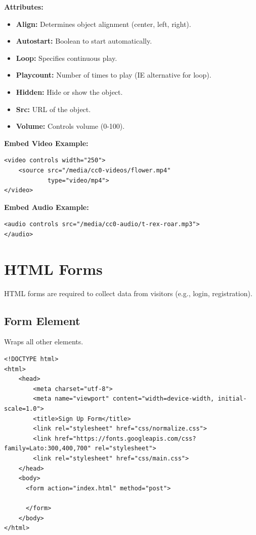\documentclass[12pt,a4paper]{article}
\begin{document}
\textbf{Attributes:}
\begin{itemize}
    \item \textbf{Align:} Determines object alignment (center, left, right).
    \item \textbf{Autostart:} Boolean to start automatically.
    \item \textbf{Loop:} Specifies continuous play.
    \item \textbf{Playcount:} Number of times to play (IE alternative for loop).
    \item \textbf{Hidden:} Hide or show the object.
    \item \textbf{Src:} URL of the object.
    \item \textbf{Volume:} Controls volume (0-100).
\end{itemize}

\textbf{Embed Video Example:}
\begin{verbatim}
<video controls width="250">
    <source src="/media/cc0-videos/flower.mp4"
            type="video/mp4">
</video>
\end{verbatim}

\textbf{Embed Audio Example:}
\begin{verbatim}
<audio controls src="/media/cc0-audio/t-rex-roar.mp3">
</audio>
\end{verbatim}

\section*{HTML Forms}
HTML forms are required to collect data from visitors (e.g., login, registration).

\subsection*{Form Element}
Wraps all other elements.
\begin{verbatim}
<!DOCTYPE html>
<html>
    <head>
        <meta charset="utf-8">
        <meta name="viewport" content="width=device-width, initial-scale=1.0">
        <title>Sign Up Form</title>
        <link rel="stylesheet" href="css/normalize.css">
        <link href="https://fonts.googleapis.com/css?family=Lato:300,400,700" rel="stylesheet">
        <link rel="stylesheet" href="css/main.css">
    </head>
    <body>
      <form action="index.html" method="post">
      
      </form>
    </body>
</html>
\end{verbatim}
\end{document}
